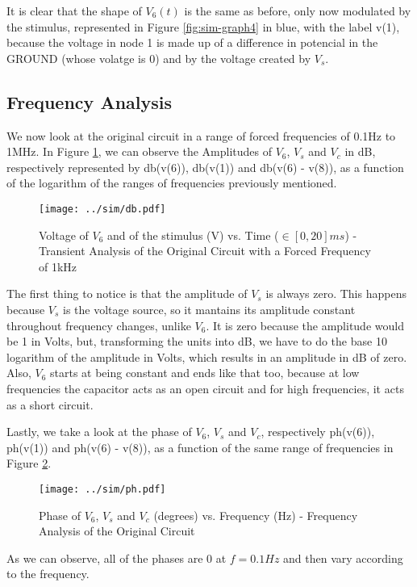 It is clear that the shape of $V_6(t)$ is the same as before, only now modulated by the stimulus, represented in Figure \ref{fig:sim-graph4} in blue, with the label v(1), because the voltage in node 1 is made up of a difference in potencial in the GROUND (whose volatge is 0) and by the voltage created by $V_s$.

\subsection{Frequency Analysis}
\label{subsec:sim_freq}

We now look at the original circuit in a range of forced frequencies of 0.1Hz to 1MHz. In Figure \ref{fig:sim_db}, we can observe the Amplitudes of $V_6$, $V_s$ and $V_c$ in dB, respectively represented by db(v(6)), db(v(1)) and db(v(6) - v(8)), as a function of the logarithm of the ranges of frequencies previously mentioned.

\begin{figure}[H] \centering
\texttt{[image: ../sim/db.pdf]}
\caption{Voltage of $V_6$ and of the stimulus (V) vs. Time ($\in [0, 20]ms$) - Transient Analysis of the Original Circuit with a Forced Frequency of 1kHz}
\label{fig:sim_db}
\end{figure}

The first thing to notice is that the amplitude of $V_s$ is always zero. This happens because $V_s$ is the voltage source, so it mantains its amplitude constant throughout frequency changes, unlike $V_6$. It is zero because the amplitude would be 1 in Volts, but, transforming the units into dB, we have to do the base 10 logarithm of the amplitude in Volts, which results in an amplitude in dB of zero. Also, $V_6$ starts at being constant and ends like that too, because at low frequencies the capacitor acts as an open circuit and for high frequencies, it acts as a short circuit.
\par
Lastly, we take a look at the phase of $V_6$, $V_s$ and $V_c$, respectively ph(v(6)), ph(v(1)) and ph(v(6) - v(8)), as a function of the same range of frequencies in Figure \ref{fig:sim_ph}.

\begin{figure}[H] \centering
\texttt{[image: ../sim/ph.pdf]}
\caption{Phase of $V_6$, $V_s$ and $V_c$ (degrees) vs. Frequency (Hz) - Frequency Analysis of the Original Circuit}
\label{fig:sim_ph}
\end{figure}


As we can observe, all of the phases are 0 at $f=0.1Hz$ and then vary according to the frequency. 











